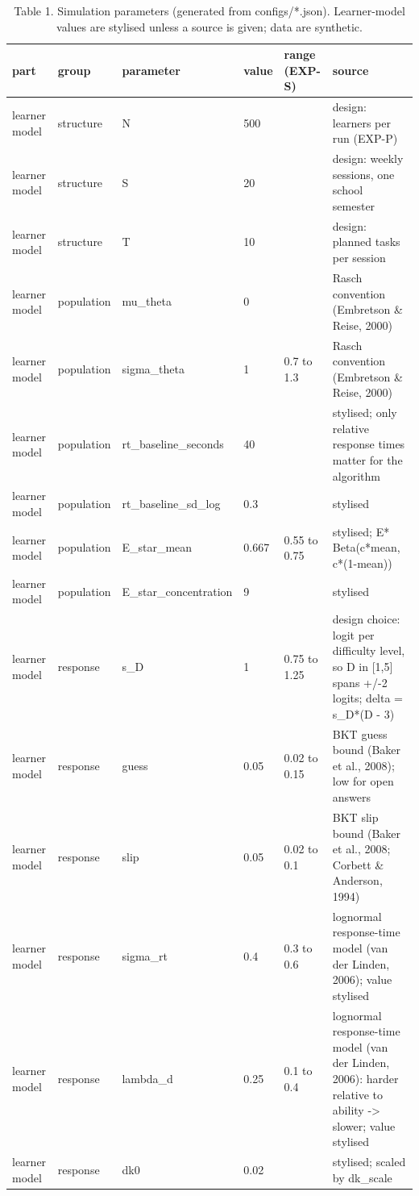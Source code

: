 \begin{table}[H]
\caption{Table 1. Simulation parameters (generated from configs/*.json). Learner-model values are stylised unless a source is given; data are synthetic.}
\label{tab:table1_parameters}
\centering
\small
\begin{tabular}{llllll}
\toprule
part & group & parameter & value & range (EXP-S) & source \\
\midrule
learner model & structure & N & 500 &  & design: learners per run (EXP-P) \\
learner model & structure & S & 20 &  & design: weekly sessions, one school semester \\
learner model & structure & T & 10 &  & design: planned tasks per session \\
learner model & population & mu\_theta & 0 &  & Rasch convention (Embretson \& Reise, 2000) \\
learner model & population & sigma\_theta & 1 & 0.7 to 1.3 & Rasch convention (Embretson \& Reise, 2000) \\
learner model & population & rt\_baseline\_seconds & 40 &  & stylised; only relative response times matter for the algorithm \\
learner model & population & rt\_baseline\_sd\_log & 0.3 &  & stylised \\
learner model & population & E\_star\_mean & 0.667 & 0.55 to 0.75 & stylised; E* ~ Beta(c*mean, c*(1-mean)) \\
learner model & population & E\_star\_concentration & 9 &  & stylised \\
learner model & response & s\_D & 1 & 0.75 to 1.25 & design choice: logit per difficulty level, so D in [1,5] spans +/-2 logits; delta = s\_D*(D - 3) \\
learner model & response & guess & 0.05 & 0.02 to 0.15 & BKT guess bound (Baker et al., 2008); low for open answers \\
learner model & response & slip & 0.05 & 0.02 to 0.1 & BKT slip bound (Baker et al., 2008; Corbett \& Anderson, 1994) \\
learner model & response & sigma\_rt & 0.4 & 0.3 to 0.6 & lognormal response-time model (van der Linden, 2006); value stylised \\
learner model & response & lambda\_d & 0.25 & 0.1 to 0.4 & lognormal response-time model (van der Linden, 2006): harder relative to ability -> slower; value stylised \\
learner model & response & dk0 & 0.02 &  & stylised; scaled by dk\_scale \\

\end{tabular}
\end{table}
